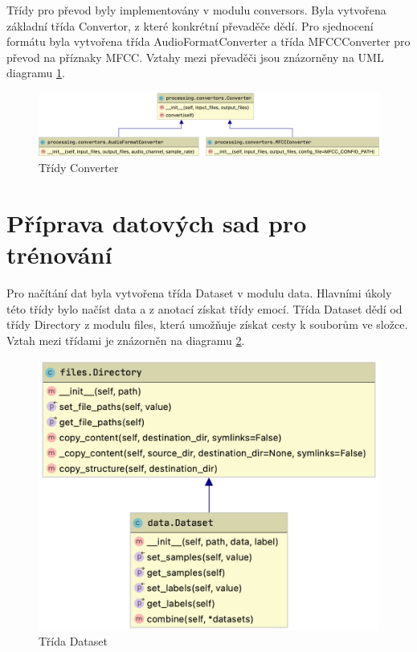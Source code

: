 \documentclass[FM,BP]{tulthesis}
\begin{document}
Třídy pro převod byly implementovány v modulu conversors. Byla vytvořena základní třída Convertor, z které konkrétní převaděče dědí. Pro sjednocení formátu byla vytvořena třída AudioFormatConverter a třída MFCCConverter pro převod na příznaky MFCC. Vztahy mezi převaděči jsou znázorněny na UML diagramu \ref{fig:convertor}.

\begin{figure}[ht]
\centerline{\includegraphics[width=\textwidth,height=\textheight,keepaspectratio]{convertors.png}}
\caption{Třídy Converter}
\label{fig:convertor}
\end{figure}
\FloatBarrier

\section{Příprava datových sad pro trénování} %
Pro načítání dat byla vytvořena třída Dataset v modulu data. Hlavními úkoly této třídy bylo načíst data a z anotací získat třídy emocí. Třída Dataset dědí od třídy Directory z modulu files, která umožňuje získat cesty k souborům ve složce. Vztah mezi třídami je znázorněn na diagramu \ref{fig:datasets}.

\begin{figure}[h!]
\centerline{\includegraphics[scale=.25,keepaspectratio]{data-dataset.png}}
\caption{Třída Dataset}
\label{fig:datasets}
\end{figure}
\FloatBarrier
\end{document}
